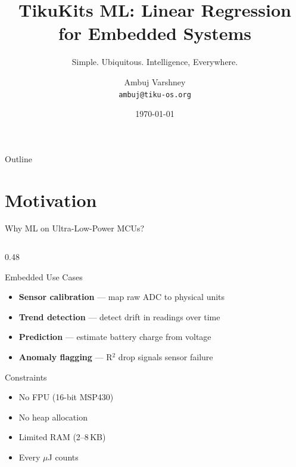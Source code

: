 \documentclass[aspectratio=169, 10pt]{beamer}
\title[TikuKits ML]{TikuKits ML: Linear Regression for Embedded Systems}
\subtitle{Simple. Ubiquitous. Intelligence, Everywhere.}
\author[Ambuj Varshney]{Ambuj Varshney \\ \texttt{ambuj@tiku-os.org}}
\date{\today}
\begin{document}
\begin{frame}
\titlepage
\end{frame}

\begin{frame}{Outline}
\tableofcontents
\end{frame}

\section{Motivation}

\begin{frame}{Why ML on Ultra-Low-Power MCUs?}
\begin{columns}[T]
\begin{column}{0.48\textwidth}
\begin{block}{Embedded Use Cases}
\begin{itemize}
  \item \textbf{Sensor calibration} --- map raw ADC to physical units
  \item \textbf{Trend detection} --- detect drift in readings over time
  \item \textbf{Prediction} --- estimate battery charge from voltage
  \item \textbf{Anomaly flagging} --- R$^2$ drop signals sensor failure
\end{itemize}
\end{block}

\begin{block}{Constraints}
\begin{itemize}
  \item No FPU (16-bit MSP430)
  \item No heap allocation
  \item Limited RAM (2--8\,KB)
  \item Every $\mu$J counts
\end{itemize}
\end{block}
\end{column}


\end{columns}
\end{frame}
\end{document}
